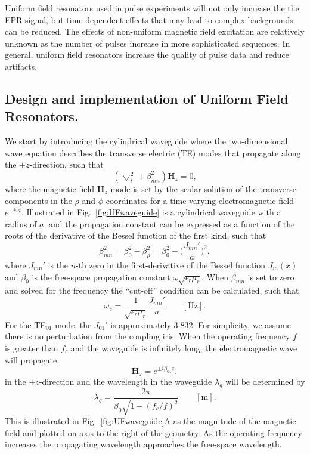 Uniform field resonators used in pulse experiments will not only increase the the EPR signal, but time-dependent effects that may lead to complex backgrounds can be reduced. The effects of non-uniform magnetic field excitation are relatively unknown as the number of pulses increase in more sophisticated sequences. In general, uniform field resonators increase the quality of pulse data and reduce artifacts.

\subsection*{Design and implementation of Uniform Field Resonators.}
We start by introducing the cylindrical waveguide where the two-dimensional wave equation describes the transverse electric (TE) modes that propagate along the $\pm z$-direction, such that
\begin{equation}
    (\bigtriangledown_t^2 + \beta_{mn}^2) \mathbf{H}_z = 0,
\end{equation}
where the magnetic field $\mathbf{H}_z$ mode is set by the scalar solution of the transverse components in the $\rho$ and $\phi$ coordinates for a time-varying electromagnetic field $e^{-i \omega t}$. Illustrated in Fig.~\ref{fig:UFwaveguide} is a cylindrical waveguide with a radius of $a$, and the propagation constant can be expressed as a function of the roots of the derivative of the Bessel function of the first kind, such that
\begin{equation}
    \beta_{mn}^2 = \beta_0^2 - \beta_\rho^2 = \beta_0^2 - \bigg(\frac{J_{mn}'}{a}\bigg)^2,
\end{equation}
where $J_{mn}'$ is the $n$-th zero in the first-derivative of the Bessel function $J_m(x)$ and $\beta_0$ is the free-space propagation constant $\omega\sqrt{\epsilon_r \mu_r}$. When $\beta_{mn}$ is set to zero and solved for the frequency the ``cut-off'' condition can be calculated, such that
\begin{equation}
    \omega_c = \frac{1}{\sqrt{\epsilon_r \mu_r}}\frac{J_{mn}'}{a} \qquad [\text{Hz}].
\end{equation}
For the TE$_{01}$ mode, the $J_{01}'$ is approximately 3.832. For simplicity, we assume there is no perturbation from the coupling iris. When the operating frequency $f$ is greater than $f_c$ and the waveguide is infinitely long, the electromagnetic wave will propagate,
\begin{equation}
    \mathbf{H}_z = e^{\pm i\beta_{01}z},\label{propH}
\end{equation}
in the $\pm z$-direction and the wavelength in the waveguide $\lambda_g$ will be determined by 
\begin{equation}
    \lambda_g = \frac{2\pi}{\beta_0 \sqrt{1-(f_c/f)^2}} \qquad [\text{m}].\label{wavelength}
\end{equation}
This is illustrated in Fig.~\ref{fig:UFwaveguide}A as the magnitude of the magnetic field and plotted on axis to the right of the geometry. As the operating frequency increases the propagating wavelength approaches the free-space wavelength. \cite{harrington1961time} 


